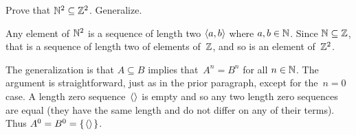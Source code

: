 \documentclass{test}  %
\begin{document}
\begin{problem}
Prove that $\mathbb{N}^2\subseteq \mathbb{Z}^2$.
Generalize. 
\begin{answer}
Any element of $\mathbb{N}^2$ is a sequence of length two $\langle a,b\rangle$ where
$a,b\in\mathbb{N}$.
Since $\mathbb{N}\subseteq\mathbb{Z}$, that is a sequence of length two of elements of~$\mathbb{Z}$, 
and so is an element of~$\mathbb{Z}^2$.

The generalization is that $A\subseteq B$ implies that~$A^n=B^n$ for all 
$n\in\mathbb{N}$.
The argument is straightforward, just as in the prior paragraph,
except for the~$n=0$ case.
A length zero sequence~$\langle\rangle$ is empty and so any two 
length zero sequences are equal (they have the same length and do not 
differ on any of their terms).
Thus $A^0=B^0=\mbox{$\{\hspace{0.1em}\langle\rangle\hspace{0.1em}\}$}$.
\end{answer}
\end{problem}
\end{document}
